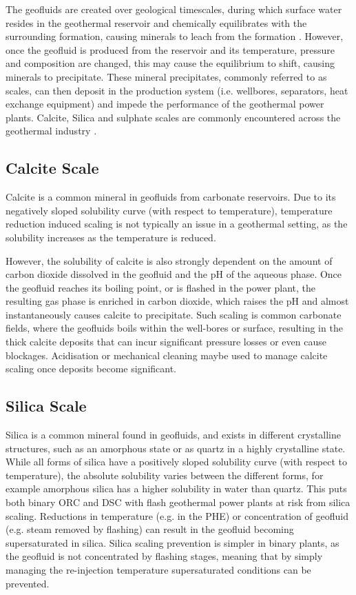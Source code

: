         The geofluids are created over geological timescales, during which surface water resides in the geothermal reservoir and chemically equilibrates with the surrounding formation, causing minerals to leach from the formation \cite{DiPippo2016}. However, once the geofluid is produced from the reservoir and its temperature, pressure and composition are changed, this may cause the equilibrium to shift, causing minerals to precipitate. These mineral precipitates, commonly referred to as scales, can then deposit in the production system (i.e. wellbores, separators, heat exchange equipment) and impede the performance of the geothermal power plants. Calcite, Silica and sulphate scales are commonly encountered across the geothermal industry \cite{LuoKottsova2023}.

    \subsection{Calcite Scale}
        Calcite  is a common mineral in geofluids from carbonate reservoirs. Due to its negatively sloped solubility curve (with respect to temperature), temperature reduction induced scaling is not typically an issue in a geothermal setting, as the solubility increases as the temperature is reduced.
    
        However, the solubility of calcite is also strongly dependent on the amount of carbon dioxide dissolved in the geofluid and the pH of the aqueous phase. Once the geofluid reaches its boiling point, or is flashed in the power plant, the resulting gas phase is enriched in carbon dioxide, which raises the pH and almost instantaneously causes calcite to precipitate. Such scaling is common carbonate fields, where the geofluids boils within the well-bores or surface, resulting in the thick calcite deposits that can incur significant pressure losses or even cause blockages\cite{DiPippo2016}. Acidisation or mechanical cleaning maybe used to manage calcite scaling once deposits become significant.

    \subsection{Silica Scale}
        Silica  is a common mineral found in geofluids, and exists in different crystalline structures, such as an amorphous state or as quartz in a highly crystalline state. While all forms of silica have a positively sloped solubility curve (with respect to temperature), the absolute solubility varies between the different forms, for example amorphous silica has a higher solubility in water than quartz\cite{DiPippo2016}. This puts both binary \ac{ORC} and \ac{DSC} with flash geothermal power plants at risk from silica scaling. Reductions in temperature (e.g. in the \ac{PHE}) or concentration of geofluid (e.g. steam removed by flashing) can result in the geofluid becoming supersaturated in silica. Silica scaling prevention is simpler in binary plants, as the geofluid is not concentrated by flashing stages, meaning that by simply managing the re-injection temperature supersaturated conditions can be prevented.   
    
